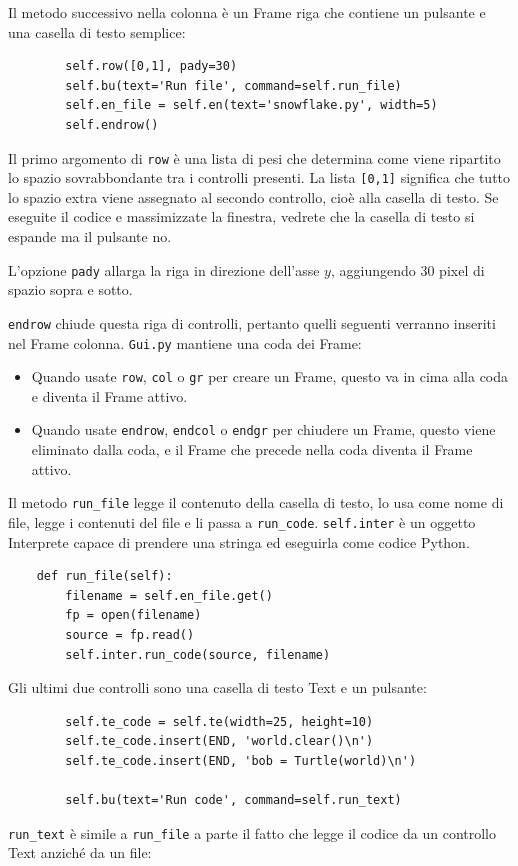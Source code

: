 \documentclass[10pt]{book}
\begin{document}
Il metodo successivo nella colonna è un Frame riga che contiene un pulsante e una casella di testo semplice:

\begin{verbatim}
        self.row([0,1], pady=30)
        self.bu(text='Run file', command=self.run_file)
        self.en_file = self.en(text='snowflake.py', width=5)
        self.endrow()
\end{verbatim}
%
Il primo argomento di {\tt row} è una lista di pesi che determina come viene ripartito lo spazio sovrabbondante tra i controlli presenti. La lista {\tt [0,1]} significa che tutto lo spazio extra viene assegnato al secondo controllo, cioè alla casella di testo. Se eseguite il codice e massimizzate la finestra, vedrete che la casella di testo si espande ma il pulsante no.

L'opzione {\tt pady} allarga la riga in direzione dell'asse $y$, aggiungendo 30 pixel di spazio sopra e sotto.

{\tt endrow} chiude questa riga di controlli, pertanto quelli seguenti verranno inseriti nel Frame colonna.   {\tt Gui.py} mantiene una coda dei Frame:

\begin{itemize}

\item Quando usate {\tt row}, {\tt col} o {\tt gr} per creare un Frame, questo va in cima alla coda e diventa il Frame attivo.

\item Quando usate {\tt endrow}, {\tt endcol} o {\tt endgr} per chiudere un Frame, questo viene eliminato dalla coda, e il Frame che precede nella coda diventa il Frame attivo.

\end{itemize} 

Il metodo \verb"run_file" legge il contenuto della casella di testo, lo usa come nome di file, legge i contenuti del file e li passa a \verb"run_code".  {\tt self.inter} è un oggetto Interprete capace di prendere una stringa ed eseguirla come codice Python.

\begin{verbatim}
    def run_file(self):
        filename = self.en_file.get()
        fp = open(filename)
        source = fp.read()
        self.inter.run_code(source, filename)
\end{verbatim}
%
Gli ultimi due controlli sono una casella di testo Text e un pulsante:

\begin{verbatim}
        self.te_code = self.te(width=25, height=10)
        self.te_code.insert(END, 'world.clear()\n')
        self.te_code.insert(END, 'bob = Turtle(world)\n')

        self.bu(text='Run code', command=self.run_text)
\end{verbatim}
%
\verb"run_text" è simile a \verb"run_file" a parte il fatto che legge il codice da un controllo Text anziché da un file:
\end{document}

